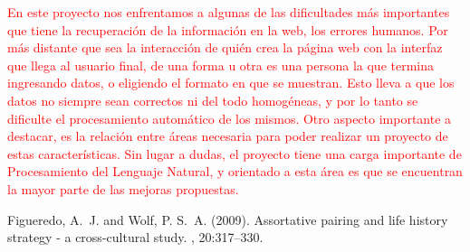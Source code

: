 \documentclass[12pt]{article} %
\begin{document}
\textcolor{red}{En este proyecto nos enfrentamos a algunas de las dificultades más importantes que tiene la recuperación de la información en la web, los errores humanos. Por más distante que sea la interacción de quién crea la página web con la interfaz que llega al usuario final, de una forma u otra es una persona la que termina ingresando datos, o eligiendo el formato en que se muestran. Esto lleva a que los datos no siempre sean correctos ni del todo homogéneas, y por lo tanto se dificulte el procesamiento automático de los mismos.
Otro aspecto importante a destacar, es la relación entre áreas necesaria para poder realizar un proyecto de estas características. Sin lugar a dudas, el proyecto tiene una carga importante de Procesamiento del Lenguaje Natural, y orientado a esta área es que se encuentran la mayor parte de las mejoras propuestas.}




\begin{thebibliography}{99} %

Figueredo, A.~J. and Wolf, P. S.~A. (2009).
\newblock Assortative pairing and life history strategy - a cross-cultural
  study.
, 20:317--330.
 
\end{thebibliography}

\end{document}
